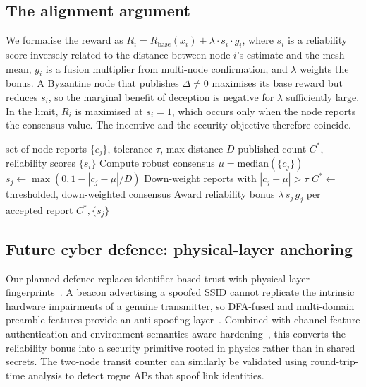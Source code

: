 \documentclass[journal,10pt]{IEEEtran}
\begin{document}
\subsection{The alignment argument}
We formalise the reward as $R_i = R_{\mathrm{base}}(x_i) + \lambda \cdot
s_i \cdot g_i$, where $s_i$ is a reliability score inversely related to the
distance between node $i$'s estimate and the mesh mean, $g_i$ is a fusion
multiplier from multi-node confirmation, and $\lambda$ weights the bonus. A
Byzantine node that publishes $\Delta \neq 0$ maximises its base reward but
reduces $s_i$, so the marginal benefit of deception is negative for
$\lambda$ sufficiently large. In the limit, $R_i$ is maximised at
$s_i = 1$, which occurs only when the node reports the consensus value. The
incentive and the security objective therefore coincide.

\begin{algorithm}[t]
\caption{Reputation-weighted mesh confirmation}
\label{alg:mesh}
\begin{algorithmic}[1]
\Require set of node reports $\{c_j\}$, tolerance $\tau$, max distance $D$
\Ensure published count $C^*$, reliability scores $\{s_i\}$
\State Compute robust consensus $\mu = \mathrm{median}(\{c_j\})$
  \State $s_j \gets \max(0, 1 - |c_j - \mu| / D)$
\EndFor
\State Down-weight reports with $|c_j - \mu| > \tau$
\State $C^* \gets$ thresholded, down-weighted consensus
\State Award reliability bonus $\lambda\, s_j\, g_j$ per accepted report
\State \Return $C^*, \{s_j\}$
\end{algorithmic}
\end{algorithm}

\subsection{Future cyber defence: physical-layer anchoring}
Our planned defence replaces identifier-based trust with physical-layer
fingerprints~\cite{zhang2025survey,zhang2023wifi}. A beacon advertising a
spoofed SSID cannot replicate the intrinsic hardware impairments of a genuine
transmitter, so DFA-fused and multi-domain preamble features provide an
anti-spoofing layer~\cite{dfa2025}. Combined with channel-feature authentication
and environment-semantics-aware hardening~\cite{esaNet}, this converts the
reliability bonus into a security primitive rooted in physics rather than in
shared secrets. The two-node transit counter can similarly be validated using
round-trip-time analysis to detect rogue APs that spoof link identities.
\end{document}
